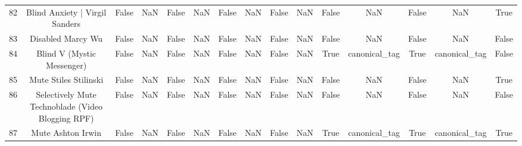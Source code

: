 \begin{table}[h!]
{\begin{tabular}{|c|c|c|c|c|c|c|c|c|c|c|c|c|c|c|}
         82 &                    Blind Anxiety | Virgil Sanders &                          False &                       NaN &                          False &                       NaN &                          False &                       NaN &                          False &                       NaN &                          False &                       NaN &                          False &                       NaN &                           True \\
         83 &                                 Disabled Marcy Wu &                          False &                       NaN &                          False &                       NaN &                          False &                       NaN &                          False &                       NaN &                          False &                       NaN &                          False &                       NaN &                          False \\
         84 &                        Blind V (Mystic Messenger) &                          False &                       NaN &                          False &                       NaN &                          False &                       NaN &                          False &                       NaN &                           True &             canonical\_tag &                           True &             canonical\_tag &                          False \\
         85 &                             Mute Stiles Stilinski &                          False &                       NaN &                          False &                       NaN &                          False &                       NaN &                          False &                       NaN &                          False &                       NaN &                          False &                       NaN &                           True \\
         86 & Selectively Mute Technoblade (Video Blogging RPF) &                          False &                       NaN &                          False &                       NaN &                          False &                       NaN &                          False &                       NaN &                          False &                       NaN &                          False &                       NaN &                          False \\
         87 &                                 Mute Ashton Irwin &                          False &                       NaN &                          False &                       NaN &                          False &                       NaN &                          False &                       NaN &                           True &             canonical\_tag &                           True &             canonical\_tag &                           True \\

\end{tabular}}
\end{table}
